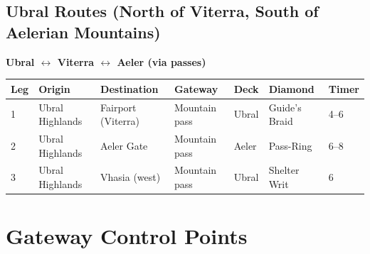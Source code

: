 \documentclass[11pt,letterpaper,twoside]{book}
\begin{document}
\subsection{Ubral Routes (North of Viterra, South of Aelerian Mountains)}

\textbf{Ubral $\leftrightarrow$ Viterra $\leftrightarrow$ Aeler (via passes)}

\begin{longtable}{|p{1.5cm}|p{2.5cm}|p{2.5cm}|p{1.5cm}|p{2cm}|p{1.5cm}|}
\hline
\textbf{Leg} & \textbf{Origin} & \textbf{Destination} & \textbf{Gateway} & \textbf{Deck} & \textbf{Diamond} & \textbf{Timer} \\
 & Ubral Highlands & Fairport (Viterra) & Mountain pass & Ubral & Guide's Braid & 4--6 \\
2 & Ubral Highlands & Aeler Gate & Mountain pass & Aeler & Pass-Ring & 6--8 \\
3 & Ubral Highlands & Vhasia (west) & Mountain pass & Ubral & Shelter Writ & 6 \\
\hline
\end{longtable}

\section{Gateway Control Points}
\end{document}
